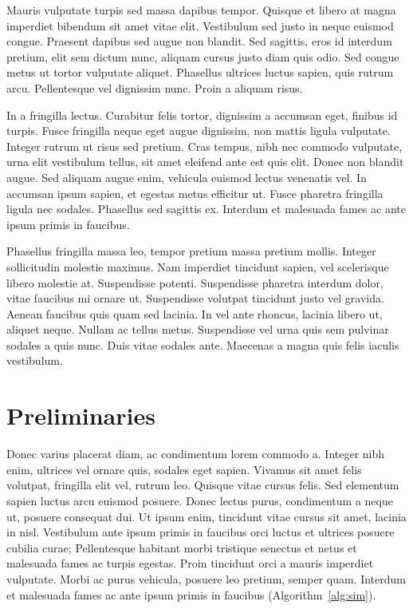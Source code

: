 \documentclass[final,5p,times,twocolumn]{elsarticle}
\begin{document}
Mauris vulputate turpis sed massa dapibus tempor. Quisque et libero at magna imperdiet bibendum sit amet vitae elit. Vestibulum sed justo in neque euismod congue. Praesent dapibus sed augue non blandit. Sed sagittis, eros id interdum pretium, elit sem dictum nunc, aliquam cursus justo diam quis odio. Sed congue metus ut tortor vulputate aliquet. Phasellus ultrices luctus sapien, quis rutrum arcu. Pellentesque vel dignissim nunc. Proin a aliquam risus.

In a fringilla lectus. Curabitur felis tortor, dignissim a accumsan eget, finibus id turpis. Fusce fringilla neque eget augue dignissim, non mattis ligula vulputate. Integer rutrum ut risus sed pretium. Cras tempus, nibh nec commodo vulputate, urna elit vestibulum tellus, sit amet eleifend ante est quis elit. Donec non blandit augue. Sed aliquam augue enim, vehicula euismod lectus venenatis vel. In accumsan ipsum sapien, et egestas metus efficitur ut. Fusce pharetra fringilla ligula nec sodales. Phasellus sed sagittis ex. Interdum et malesuada fames ac ante ipsum primis in faucibus.

Phasellus fringilla massa leo, tempor pretium massa pretium mollis. Integer sollicitudin molestie maximus. Nam imperdiet tincidunt sapien, vel scelerisque libero molestie at. Suspendisse potenti. Suspendisse pharetra interdum dolor, vitae faucibus mi ornare ut. Suspendisse volutpat tincidunt justo vel gravida. Aenean faucibus quis quam sed lacinia. In vel ante rhoncus, lacinia libero ut, aliquet neque. Nullam ac tellus metus. Suspendisse vel urna quis sem pulvinar sodales a quis nunc. Duis vitae sodales ante. Maecenas a magna quis felis iaculis vestibulum.

\section{Preliminaries}
\label{sec:pl}

Donec varius placerat diam, ac condimentum lorem commodo a. Integer nibh enim, ultrices vel ornare quis, sodales eget sapien. Vivamus sit amet felis volutpat, fringilla elit vel, rutrum leo. Quisque vitae cursus felis. Sed elementum sapien luctus arcu euismod posuere. Donec lectus purus, condimentum a neque ut, posuere consequat dui. Ut ipsum enim, tincidunt vitae cursus sit amet, lacinia in nisl. Vestibulum ante ipsum primis in faucibus orci luctus et ultrices posuere cubilia curae; Pellentesque habitant morbi tristique senectus et netus et malesuada fames ac turpis egestas. Proin tincidunt orci a mauris imperdiet vulputate. Morbi ac purus vehicula, posuere leo pretium, semper quam. Interdum et malesuada fames ac ante ipsum primis in faucibus (Algorithm~\ref{alg:sim}). 
\end{document}
